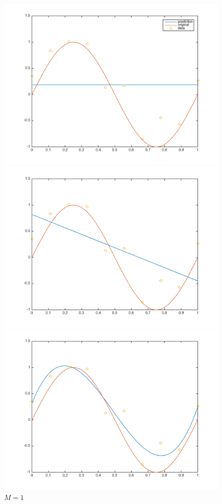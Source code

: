 \documentclass[11pt,letterpaper]{article}
\begin{document}
\begin{figure}[h!]
  \includegraphics[width=\linewidth]{figures/basism0.png}
  \caption{$M = 0$}\label{fig:basism0}
\endminipage\hfill
{}
  \includegraphics[width=\linewidth]{figures/basism1.png}
  \caption{$M = 1$}\label{fig:basism1}
\endminipage\hfill
{}
  \includegraphics[width=\linewidth]{figures/basism3.png}

\end{figure}
\end{document}
